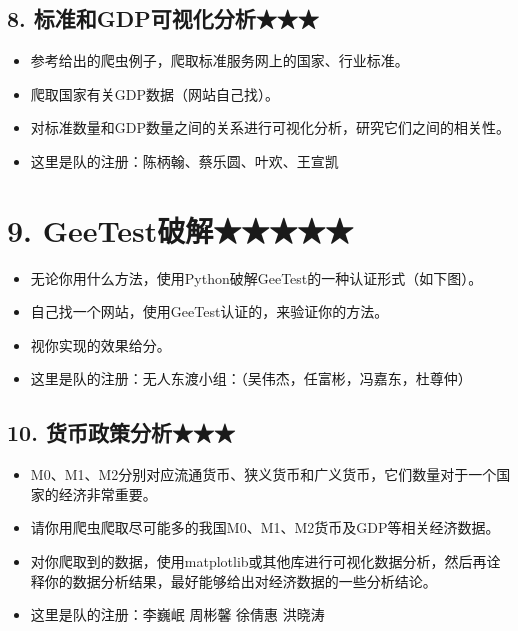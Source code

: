 \documentclass[11pt]{article}
\providecommand{\tightlist}{%
      \setlength{\itemsep}{0pt}\setlength{\parskip}{0pt}}
\begin{document}
    \subsection{8.
标准和GDP可视化分析★★★}\label{ux6807ux51c6ux548cgdpux53efux89c6ux5316ux5206ux6790}

\begin{itemize}
\tightlist
\item
  参考给出的爬虫例子，爬取标准服务网上的国家、行业标准。
\item
  爬取国家有关GDP数据（网站自己找）。
\item
  对标准数量和GDP数量之间的关系进行可视化分析，研究它们之间的相关性。
\item
  这里是队的注册：陈柄翰、蔡乐圆、叶欢、王宣凯
\end{itemize}

    \section{9. GeeTest破解★★★★★}\label{geetestux7834ux89e3}

\begin{itemize}
\tightlist
\item
  无论你用什么方法，使用Python破解GeeTest的一种认证形式（如下图）。 
\item
  自己找一个网站，使用GeeTest认证的，来验证你的方法。
\item
  视你实现的效果给分。
\item
  这里是队的注册：无人东渡小组：（吴伟杰，任富彬，冯嘉东，杜尊仲）
\end{itemize}

    \subsection{10.
货币政策分析★★★}\label{ux8d27ux5e01ux653fux7b56ux5206ux6790}

\begin{itemize}
\tightlist
\item
  M0、M1、M2分别对应流通货币、狭义货币和广义货币，它们数量对于一个国家的经济非常重要。
\item
  请你用爬虫爬取尽可能多的我国M0、M1、M2货币及GDP等相关经济数据。
\item
  对你爬取到的数据，使用matplotlib或其他库进行可视化数据分析，然后再诠释你的数据分析结果，最好能够给出对经济数据的一些分析结论。
\item
  这里是队的注册：李巍岷 周彬馨 徐倩惠 洪晓涛
\end{itemize}
\end{document}
